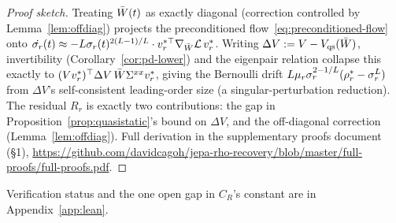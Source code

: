 \begin{proof}[Proof sketch]
Treating $\bar{W}(t)$ as exactly diagonal (correction controlled by Lemma~\ref{lem:offdiag})
projects the preconditioned flow~\eqref{eq:preconditioned-flow} onto
$\dot{\sigma_r}(t) \approx -L\sigma_r(t)^{2(L-1)/L}\cdot v_r^{*\top}\nabla_{\bar{W}}\mathcal{L}\,v_r^*$.
Writing $\Delta V := V - V_{\mathrm{qs}}(\bar{W})$, invertibility (Corollary~\ref{cor:pd-lower})
and the eigenpair relation collapse this exactly to
$(Vv_r^*)^\top\Delta V\,\bar{W}\Sigma^{xx} v_r^*$, giving the Bernoulli drift
$L\mu_r\sigma_r^{2-1/L}(\rho_r^*-\sigma_r^L)$ from $\Delta V$'s self-consistent
leading-order size (a singular-perturbation reduction). The residual $R_r$ is exactly two
contributions: the gap in Proposition~\ref{prop:quasistatic}'s bound on $\Delta V$, and
the off-diagonal correction (Lemma~\ref{lem:offdiag}). Full derivation in the
supplementary proofs document (\S1),
\url{https://github.com/davidcagoh/jepa-rho-recovery/blob/master/full-proofs/full-proofs.pdf}.
\end{proof}
Verification status and the one open gap in $C_R$'s constant are in Appendix~\ref{app:lean}.
